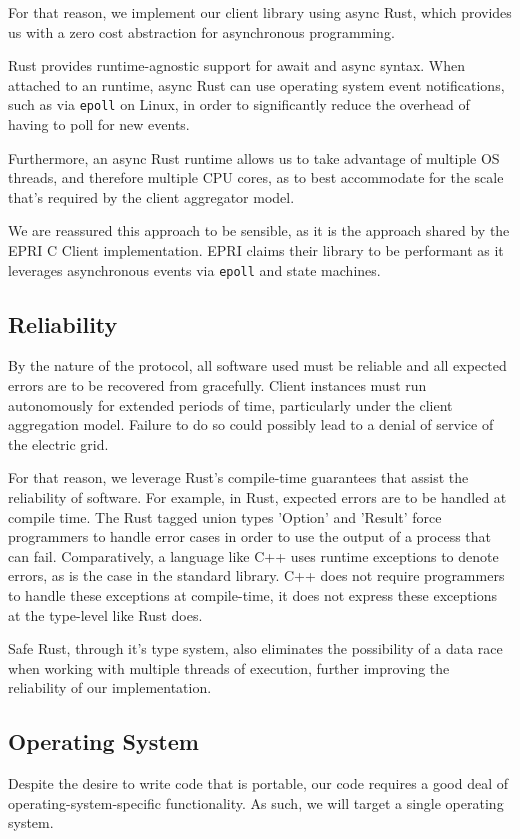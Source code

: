 For that reason, we implement our client library using async Rust, which provides us with a zero cost abstraction for asynchronous programming.

Rust provides runtime-agnostic support for await and async syntax.
When attached to an runtime, async Rust can use operating system event notifications, such as via \texttt{epoll} on Linux, in order to significantly reduce the overhead of having to poll for new events.

Furthermore, an async Rust runtime allows us to take advantage of multiple OS threads, and therefore multiple CPU cores, as to best accommodate for the scale that's required by the client aggregator model.

We are reassured this approach to be sensible, as it is the approach shared by the EPRI C Client implementation. EPRI claims their library to be performant as it leverages asynchronous events via \texttt{epoll} and state machines.


\subsection{Reliability}
By the nature of the protocol, all software used must be reliable and all expected errors are to be recovered from gracefully. Client instances must run autonomously for extended periods of time, particularly under the client aggregation model. Failure to do so could possibly lead to a denial of service of the electric grid.

For that reason, we leverage Rust's compile-time guarantees that assist the reliability of software. For example, in Rust, expected errors are to be handled at compile time. The Rust tagged union types 'Option' and 'Result' force programmers to handle error cases in order to use the output of a process that can fail. Comparatively, a language like C++ uses runtime exceptions to denote errors, as is the case in the standard library. C++ does not require programmers to handle these exceptions at compile-time, it does not express these exceptions at the type-level like Rust does.

Safe Rust, through it's type system, also eliminates the possibility of a data race when working with multiple threads of execution, further improving the reliability of our implementation.

\subsection{Operating System}
Despite the desire to write code that is portable, our code requires a good deal of operating-system-specific functionality. As such, we will target a single operating system. 

